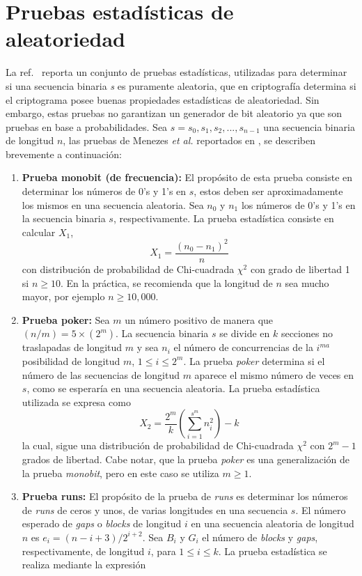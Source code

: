 \section{Pruebas estadísticas de aleatoriedad}
La ref.~\cite{MEtAl_1996} reporta un conjunto de pruebas estadísticas, utilizadas para determinar si una secuencia binaria \textit{s} es puramente aleatoria, que en criptografía determina si el criptograma posee buenas propiedades estadísticas de aleatoriedad. Sin embargo, estas pruebas no garantizan un generador de bit aleatorio ya que son pruebas en base a probabilidades. Sea $s=s_{0},s_{1},s_{2},...,s_{n-1}$ una secuencia binaria de longitud $n$, las pruebas de Menezes \textit{et al.} reportados en \cite{MEtAl_1996}, se describen brevemente a continuación:
\begin{enumerate}
   \item \textbf{Prueba monobit (de frecuencia):} El propósito de esta prueba consiste en determinar los números de 0's y 1's en $s$, estos deben ser aproximadamente los mismos en una secuencia aleatoria. Sea $n_{0}$ y $n_{1}$ los números de 0's y 1's en la secuencia binaria $s$, respectivamente. La prueba estadística consiste en calcular $X_{1}$,
\begin{equation}
X_{1}=\dfrac{(n_{0}-n_{1})^{2}}{n}
\end{equation}
con distribución de probabilidad de Chi-cuadrada $\chi^{2}$ con grado de libertad 1 si $n\geq 10$. En la práctica, se recomienda que la longitud de $n$ sea mucho mayor, por ejemplo $n\geq 10,000$. 
	\item \textbf{Prueba poker:} Sea $m$ un número positivo de manera que $(n/m)=5\times (2^{m})$. La secuencia binaria $s$ se divide en $k$ secciones no traslapadas de longitud $m$ y sea $n_{i}$ el número de concurrencias de la $i^{ma}$ posibilidad de longitud $m$, $1\leq i\leq 2^{m}$. La prueba \textit{poker} determina si el número de las secuencias de longitud $m$ aparece el mismo número de veces en $s$, como se esperaría en una secuencia aleatoria. La prueba estadística utilizada se expresa como
\begin{equation}
X_{2}=\frac{2^{m}}{k} \left(\sum^{s^{m}}_{i=1} n^{2}_{i} \right) -k 
\end{equation}	
la cual, sigue una distribución de probabilidad de Chi-cuadrada $\chi^{2}$ con $2^{m}-1$ grados de libertad. Cabe notar, que la prueba \textit{poker} es una generalización de la prueba \textit{monobit}, pero en este caso se utiliza $m\geq 1$. 	   
	\item \textbf{Prueba runs:} El propósito de la prueba de \textit{runs} es determinar los números de \textit{runs} de ceros y unos, de varias longitudes en una secuencia $s$. El número esperado de \textit{gaps} o \textit{blocks} de longitud $i$ en una secuencia aleatoria de longitud $n$ es $e_{i}=(n-i+3)/2^{i+2}$. Sea $B_{i}$ y $G_{i}$ el número de \textit{blocks} y \textit{gaps}, respectivamente, de longitud $i$, para $1\leq i\leq k$. La prueba estadística se realiza mediante la expresión

\end{enumerate}
